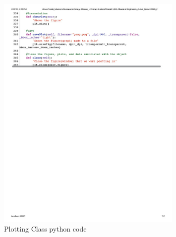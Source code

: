 \documentclass{article}
\begin{document}
\begin{figure}[H] \centering
\includegraphics[width=0.8\textwidth]{code/che_py1024_7.jpg}
\caption{\label{fig1}Plotting Class python code}\end{figure}


\end{document}

